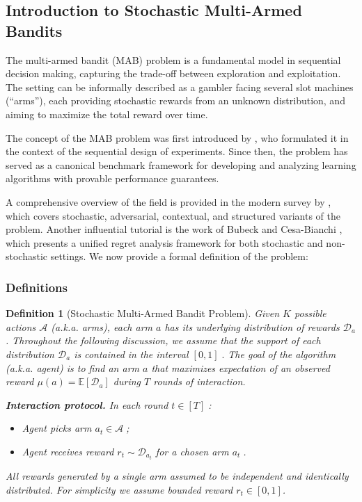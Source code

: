 \documentclass{article}
\numberwithin{equation}{section}
\newtheorem{definition}{Definition}
\newcommand{\E}{\mathbb E}
\newcommand{\cA}{\mathcal{A}}
\newcommand{\cD}{\mathcal{D}}
\newcommand{\eqsp}{\;}
\begin{document}
\subsection{Introduction to Stochastic Multi-Armed Bandits}

The multi-armed bandit (MAB) problem is a fundamental model in sequential decision making, capturing the trade-off between exploration and exploitation. The setting can be informally described as a gambler facing several slot machines (“arms”), each providing stochastic rewards from an unknown distribution, and aiming to maximize the total reward over time.

The concept of the MAB problem was first introduced by \citet{robbins1952some}, who formulated it in the context of the sequential design of experiments. Since then, the problem has served as a canonical benchmark framework for developing and analyzing learning algorithms with provable performance guarantees.

A comprehensive overview of the field is provided in the modern survey by \citet{slivkins2019introduction}, which covers stochastic, adversarial, contextual, and structured variants of the problem. Another influential tutorial is the work of Bubeck and Cesa-Bianchi \cite{bubeck2012regret}, which presents a unified regret analysis framework for both stochastic and non-stochastic settings.
We now provide a formal definition of the problem:


\subsubsection{Definitions}



\begin{definition}[Stochastic Multi-Armed Bandit Problem]
    Given $K$ possible actions $\cA$ (a.k.a. \textit{arms}), each arm $a$ has its underlying distribution of rewards $\cD_a$. Throughout the following discussion, we assume that the support of each distribution \(\cD_a\) is contained in the interval \([0,1]\eqsp.\) The goal of the algorithm (a.k.a. \textit{agent}) is to find an arm $a$ that maximizes expectation of an observed reward $\mu(a) = \E[\cD_a]$ during $T$ rounds of interaction.
    
    \textbf{Interaction protocol.}
    In each round $t \in [T]\eqsp$: 
    \begin{itemize}
        \item Agent picks arm $a_t \in \cA\eqsp$;
        \item Agent receives reward $r_t \sim \cD_{a_t}$ for a chosen arm $a_t\eqsp$.
    \end{itemize}
    
    All rewards generated by a single arm assumed to be independent and identically distributed. For simplicity we assume bounded reward $r_t \in [0,1]$.
\end{definition}
\end{document}
